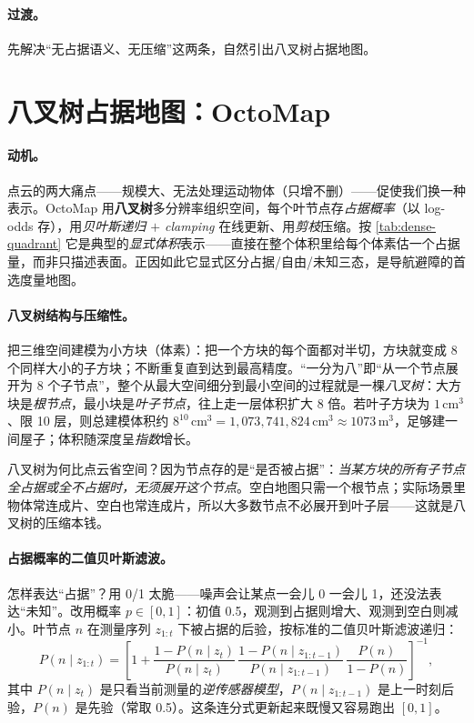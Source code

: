 \paragraph{过渡。}
先解决“无占据语义、无压缩”这两条，自然引出八叉树占据地图。

\section{八叉树占据地图：OctoMap}
\label{sec:dense-octomap}

\paragraph{动机。}
点云的两大痛点——规模大、无法处理运动物体（只增不删）——促使我们换一种表示\cite{gaoxiang2019slam14}。OctoMap\cite{hornung2013octomap} 用\textbf{八叉树}多分辨率组织空间，每个叶节点存\emph{占据概率}（以 log-odds 存），用\emph{贝叶斯递归 $+$ clamping} 在线更新、用\emph{剪枝}压缩。按 \cref{tab:dense-quadrant} 它是典型的\emph{显式体积}表示——直接在整个体积里给每个体素估一个占据量，而非只描述表面。正因如此它显式区分占据/自由/未知三态，是导航避障的首选度量地图。

\paragraph{八叉树结构与压缩性。}
把三维空间建模为小方块（体素）：把一个方块的每个面都对半切，方块就变成 8 个同样大小的子方块；不断重复直到达到最高精度。“一分为八”即“从一个节点展开为 8 个子节点”，整个从最大空间细分到最小空间的过程就是一棵\emph{八叉树}：大方块是\emph{根节点}，最小块是\emph{叶子节点}，往上走一层体积扩大 8 倍。若叶子方块为 $1\,\mathrm{cm}^3$、限 10 层，则总建模体积约 $8^{10}\,\mathrm{cm}^3 = 1{,}073{,}741{,}824\,\mathrm{cm}^3\approx 1073\,\mathrm{m}^3$，足够建一间屋子；体积随深度呈\emph{指数}增长。

八叉树为何比点云省空间？因为节点存的是“是否被占据”：\emph{当某方块的所有子节点全占据或全不占据时，无须展开这个节点}。空白地图只需一个根节点；实际场景里物体常连成片、空白也常连成片，所以大多数节点不必展开到叶子层——这就是八叉树的压缩本钱。

\paragraph{占据概率的二值贝叶斯滤波。}
怎样表达“占据”？用 0/1 太脆——噪声会让某点一会儿 0 一会儿 1，还没法表达“未知”。改用概率 $p\in[0,1]$：初值 0.5，观测到占据则增大、观测到空白则减小。叶节点 $n$ 在测量序列 $z_{1:t}$ 下被占据的后验，按标准的二值贝叶斯滤波递归\cite{hornung2013octomap}：
\begin{equation}
  P(n\mid z_{1:t})=\left[1+\frac{1-P(n\mid z_t)}{P(n\mid z_t)}\,\frac{1-P(n\mid z_{1:t-1})}{P(n\mid z_{1:t-1})}\,\frac{P(n)}{1-P(n)}\right]^{-1},
  \label{eq:dense-octo-bayes}
\end{equation}
其中 $P(n\mid z_t)$ 是只看当前测量的\emph{逆传感器模型}，$P(n\mid z_{1:t-1})$ 是上一时刻后验，$P(n)$ 是先验（常取 0.5）。这条连分式更新起来既慢又容易跑出 $[0,1]$。

